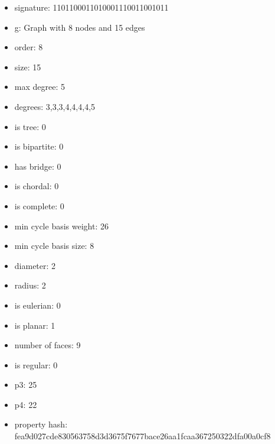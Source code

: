 \begin{itemize}
\item signature: 1101100011010001110011001011
\item g: Graph with 8 nodes and 15 edges
\item order: 8
\item size: 15
\item max degree: 5
\item degrees: 3,3,3,4,4,4,4,5
\item is tree: 0
\item is bipartite: 0
\item has bridge: 0
\item is chordal: 0
\item is complete: 0
\item min cycle basis weight: 26
\item min cycle basis size: 8
\item diameter: 2
\item radius: 2
\item is eulerian: 0
\item is planar: 1
\item number of faces: 9
\item is regular: 0
\item p3: 25
\item p4: 22
\item property hash: fea9d027cde830563758d3d3675f7677bace26aa1fcaa367250322dfa00a0cf8
\end{itemize}
\newpage
\begin{figure}
\end{figure}
